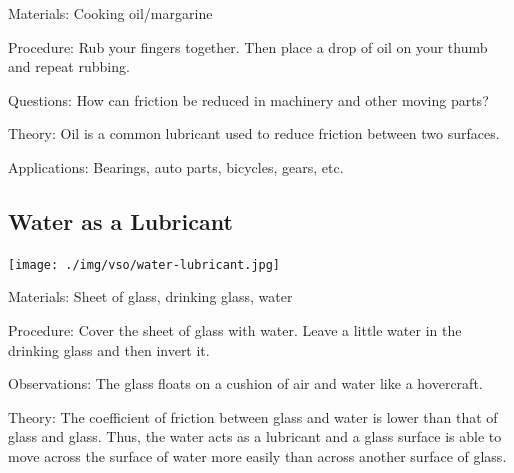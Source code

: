 \begin{multicols}{2}
\begin{description*}
\item[Materials:]{Cooking oil/margarine}
\item[Procedure:]{Rub your fingers together. Then place a drop of oil on your thumb and repeat rubbing.}
\item[Questions:]{How can friction be reduced in machinery and other moving parts?}
\item[Theory:]{Oil is a common lubricant used to reduce friction between two surfaces.}
\item[Applications:]{Bearings, auto parts, bicycles, gears, etc.}
\end{description*}

\subsection{Water as a Lubricant}

\begin{center}
\texttt{[image: ./img/vso/water-lubricant.jpg]}
\end{center}

\begin{description*}
\item[Materials:]{Sheet of glass, drinking glass, water}
\item[Procedure:]{Cover the sheet of glass with water. Leave a little water in the drinking glass and then invert it.}
\item[Observations:]{The glass floats on a cushion of air and water like a hovercraft.}
\item[Theory:]{The coefficient of friction between glass and water is lower than that of glass and glass. Thus, the water acts as a lubricant and a glass surface is able to move across the surface of water more easily than across another surface of glass.}
\end{description*}



\end{multicols}

\pagebreak